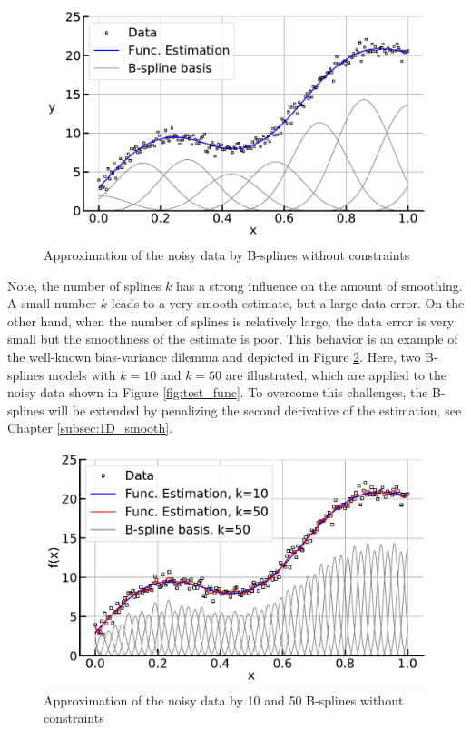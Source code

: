 \begin{figure}[H]
	\centering
	\includegraphics[width=\columnwidth]{thesisplots/smooth_bf.pdf}
	\caption{Approximation of the noisy data by B-splines without constraints}
	\label{fig:smooth_bf}
\end{figure}


Note, the number of splines $k$ has a strong influence on the amount of smoothing. A small number $k$ leads to a very smooth estimate, but a large data error. On the other hand, when the number of splines is relatively large, the data error is very small but the smoothness of the estimate is poor. This behavior is an example of the well-known bias-variance dilemma and depicted in Figure \ref{fig:smooth_bf_large}. \cite{sammut2011}
Here, two B-splines models with $k=10$ and $k=50$ are illustrated, which are applied to the noisy data shown in Figure \ref{fig:test_func}. To overcome this challenges, the B-splines will be extended by penalizing the second derivative of the estimation, see Chapter \ref{subsec:1D_smooth}. 

\begin{figure}[H]
	\centering
	\includegraphics[width=\linewidth]{thesisplots/smooth_wiggly_bf.pdf}
	\caption{Approximation of the noisy data by 10 and 50 B-splines without constraints}
	\label{fig:smooth_bf_large}
\end{figure}


